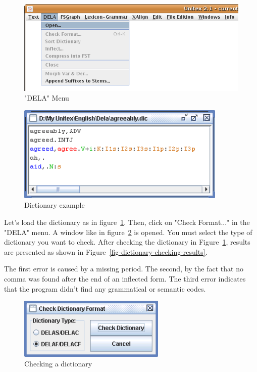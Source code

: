 \begin{figure}[h]
\begin{center}
\includegraphics[width=13cm]{resources/img/fig3-1.png}
\caption{"DELA" Menu}
\end{center}
\end{figure}

\begin{figure}[h]
\begin{center}
\includegraphics[width=10cm]{resources/img/fig3-2.png}
\caption{Dictionary example\label{fig-dictionary-example}}
\end{center}
\end{figure}

\noindent Let's load the dictionary as in figure~\ref{fig-dictionary-example}.
Then, click on "Check Format..." in the
"DELA" menu. A window like in
figure~\ref{fig-dictionary-checking} is opened. You
must select the type of dictionary you want to check. After checking the dictionary in Figure~\ref{fig-dictionary-example}, 
results are presented as shown in Figure~\ref{fig-dictionary-checking-results}.

\bigskip
\noindent The first error is caused by a missing period. The second, by the fact
that no comma was found after the end of an inflected form. The third error indicates
that the program didn't find any grammatical or semantic codes.



\begin{figure}[!h]
\begin{center}
\includegraphics[width=7cm]{resources/img/fig3-3.png}
\caption{Checking a dictionary\label{fig-dictionary-checking}}
\end{center}
\end{figure}

